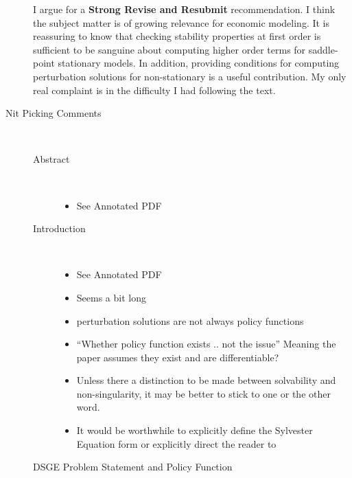 \documentclass{article}
\begin{document}
\begin{description}
I argue for a {\bf Strong Revise and Resubmit} recommendation.  I think the
subject matter is of growing relevance for economic modeling.  It is reassuring
to know that checking stability properties at first order is
sufficient to be sanguine about computing higher order terms for saddle-point
stationary models.  
In addition, providing conditions for computing perturbation solutions
for non-stationary is a useful contribution. My only real complaint is in the
difficulty I had following the text.


\item[Nit Picking Comments] \ 

\newcommand{\sap} {See Annotated PDF}

  \begin{description}
  \item[Abstract] \ 

    \begin{itemize}
    \item \sap
    \end{itemize}

  \item[Introduction] \ 


    \begin{itemize}
    \item \sap
    \item Seems a bit long
    \item perturbation solutions are not always policy functions
    \item ``Whether policy function exists .. not the issue'' 
Meaning the paper assumes they exist and are differentiable?
\item Unless there a distinction to be made between solvability and non-singularity, it may be better to stick to one or the other word.
\item It would be worthwhile to explicitly define the Sylvester Equation form or
explicitly direct the reader to \cite{chu87}
    \end{itemize}

  \item[DSGE Problem Statement and Policy Function]\ 



\end{description}
\end{description}
\end{document}
